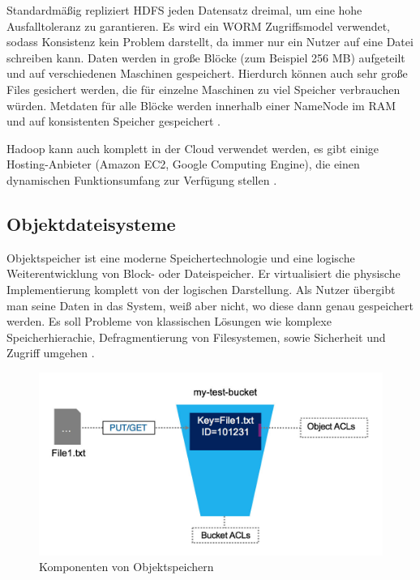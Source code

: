 Standardmäßig repliziert HDFS jeden Datensatz dreimal, um eine hohe Ausfalltoleranz zu garantieren. Es wird ein \ac{WORM} Zugriffsmodel verwendet, sodass Konsistenz kein Problem darstellt, da immer nur ein Nutzer auf eine Datei schreiben kann. Daten werden in große Blöcke (zum Beispiel 256 MB) aufgeteilt und auf verschiedenen Maschinen gespeichert. Hierdurch können auch sehr große Files gesichert werden, die für einzelne Maschinen zu viel Speicher verbrauchen würden. Metdaten für alle Blöcke werden innerhalb einer NameNode im RAM und auf konsistenten Speicher gespeichert  \parencite[Kap. I,2]{alapati.2016}.

Hadoop kann auch komplett in der Cloud verwendet werden, es gibt einige Hosting-Anbieter (Amazon EC2, Google Computing Engine), die einen dynamischen Funktionsumfang zur Verfügung stellen \parencite[Kap. I, 1]{alapati.2016}.

\subsection{Objektdateisysteme} \label{subsec:objectstorage}

Objektspeicher ist eine moderne Speichertechnologie und eine logische Weiterentwicklung von Block- oder Dateispeicher. Er virtualisiert die physische Implementierung komplett von der logischen Darstellung. Als Nutzer übergibt man seine Daten in das System, weiß aber nicht, wo diese dann genau gespeichert werden. Es soll Probleme von klassischen Lösungen wie komplexe Speicherhierachie, Defragmentierung von Filesystemen, sowie Sicherheit und Zugriff umgehen \parencite[Kap. 1, Object Storage]{varma.2015}.

\begin{figure}[hbt]
	\centering
	\includegraphics[scale=0.4]{images/object-storage}
	\caption{Komponenten von Objektspeichern \parencite[S. 5]{Rios.2017}}
	\label{fig:objectstorage}
\end{figure}

